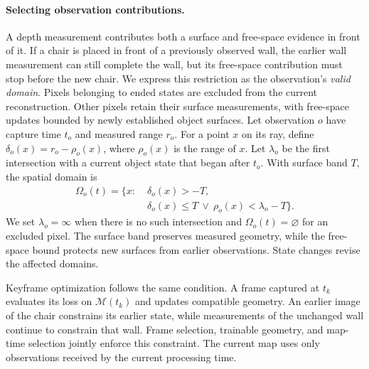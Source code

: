 \paragraph{Selecting observation contributions.}
A depth measurement contributes both a surface and free-space evidence in front of it.
If a chair is placed in front of a previously observed wall, the earlier wall measurement can still
complete the wall, but its free-space contribution must stop before the new chair. We express this
restriction as the observation's \emph{valid domain}. Pixels belonging to ended states are excluded
from the current reconstruction. Other pixels retain their surface measurements, with free-space
updates bounded by newly established object surfaces.
Let observation $o$ have capture time $t_o$ and measured range $r_o$.
For a point $x$ on its ray, define $\delta_o(x)=r_o-\rho_o(x)$, where $\rho_o(x)$ is the range of $x$.
Let $\lambda_o$ be the first intersection with a current object state that began after $t_o$.
With surface band $T$, the spatial domain is
\begin{equation}
\begin{split}
\Omega_o(t)=\{x:\;&\delta_o(x)>-T,\\
                  &\delta_o(x)\leq T\ \lor\ \rho_o(x)<\lambda_o-T\}.
\end{split}
\label{eq:domain}
\end{equation}
We set $\lambda_o=\infty$ when there is no such intersection and $\Omega_o(t)=\varnothing$ for an excluded pixel.
The surface band preserves measured geometry, while the free-space bound protects new surfaces from
earlier observations. State changes revise the affected domains.

Keyframe optimization follows the same condition. A frame captured at $t_k$ evaluates
its loss on $\mathcal{M}(t_k)$ and updates compatible geometry. An earlier image of the chair
constrains its earlier state, while measurements of the unchanged wall continue to constrain that wall.
Frame selection, trainable geometry, and map-time selection jointly enforce this constraint.
The current map uses only observations received by the current processing time.


